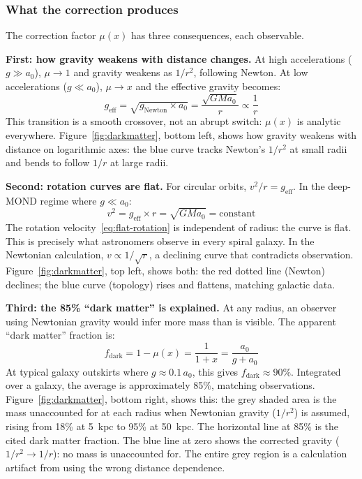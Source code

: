 \documentclass[aps,prd,preprint,superscriptaddress,showpacs,preprintnumbers,amsmath,amssymb,nofootinbib]{revtex4-2}
\begin{document}
\subsubsection*{What the correction produces}

The correction factor $\mu(x)$ has three consequences, each observable.

\textbf{First: how gravity weakens with distance changes.} At high accelerations ($g \gg a_0$), $\mu \to 1$ and gravity weakens as $1/r^2$, following Newton. At low accelerations ($g \ll a_0$), $\mu \to x$ and the effective gravity becomes:
\begin{equation}
g_{\text{eff}} = \sqrt{g_{\text{Newton}} \times a_0} = \frac{\sqrt{G M a_0}}{r} \propto \frac{1}{r}
\label{eq:deep-mond}
\end{equation}
This transition is a smooth crossover, not an abrupt switch: $\mu(x)$ is analytic everywhere. Figure~\ref{fig:darkmatter}, bottom left, shows how gravity weakens with distance on logarithmic axes: the blue curve tracks Newton's $1/r^2$ at small radii and bends to follow $1/r$ at large radii.

\textbf{Second: rotation curves are flat.} For circular orbits, $v^2/r = g_{\text{eff}}$. In the deep-MOND regime where $g \ll a_0$:
\begin{equation}
v^2 = g_{\text{eff}} \times r = \sqrt{G M a_0} = \text{constant}
\label{eq:flat-rotation}
\end{equation}
The rotation velocity~\eqref{eq:flat-rotation} is independent of radius: the curve is flat. This is precisely what astronomers observe in every spiral galaxy. In the Newtonian calculation, $v \propto 1/\sqrt{r}$, a declining curve that contradicts observation. Figure~\ref{fig:darkmatter}, top left, shows both: the red dotted line (Newton) declines; the blue curve (topology) rises and flattens, matching galactic data.

\textbf{Third: the 85\% ``dark matter'' is explained.} At any radius, an observer using Newtonian gravity would infer more mass than is visible. The apparent ``dark matter'' fraction is:
\begin{equation}
f_{\text{dark}} = 1 - \mu(x) = \frac{1}{1 + x} = \frac{a_0}{g + a_0}
\label{eq:dark-fraction}
\end{equation}
At typical galaxy outskirts where $g \approx 0.1 \, a_0$, this gives $f_{\text{dark}} \approx 90\%$. Integrated over a galaxy, the average is approximately 85\%, matching observations. Figure~\ref{fig:darkmatter}, bottom right, shows this: the grey shaded area is the mass unaccounted for at each radius when Newtonian gravity ($1/r^2$) is assumed, rising from 18\% at 5~kpc to 95\% at 50~kpc. The horizontal line at 85\% is the cited dark matter fraction. The blue line at zero shows the corrected gravity ($1/r^2 \to 1/r$): no mass is unaccounted for. The entire grey region is a calculation artifact from using the wrong distance dependence.
\end{document}
